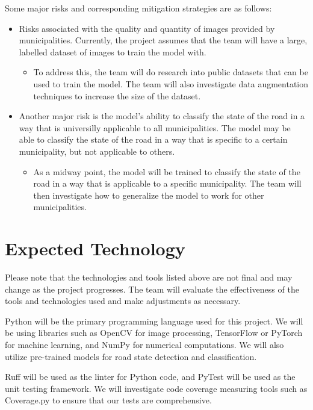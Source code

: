\documentclass{article}
\begin{document}
Some major risks and corresponding mitigation strategies are as follows:
\begin{itemize}
    \item Risks associated with the quality and quantity of images provided by municipalities. Currently, the project assumes that the team will have a large, labelled dataset of images to train the model with.
    \begin{itemize}
      \item To address this, the team will do research into public datasets that can be used to train the model. The team will also investigate data augmentation techniques to increase the size of the dataset.
    \end{itemize}  
    \item Another major risk is the model's ability to classify the state of the road in a way that is universilly applicable to all municipalities. The model may be able to classify the state of the road in a way that is specific to a certain municipality, but not applicable to others.
    \begin{itemize}
      \item As a midway point, the model will be trained to classify the state of the road in a way that is applicable to a specific municipality. The team will then investigate how to generalize the model to work for other municipalities.
    \end{itemize}
\end{itemize}

\section{Expected Technology}

Please note that the technologies and tools listed above are not final and may change as the project progresses. The team will evaluate the effectiveness of the tools and technologies used and make adjustments as necessary.

Python will be the primary programming language used for this project. We will be using libraries such as OpenCV for image processing, TensorFlow or PyTorch for machine learning, and NumPy for numerical computations. We will also utilize pre-trained models for road state detection and classification.

Ruff will be used as the linter for Python code, and PyTest will be used as the unit testing framework. We will investigate code coverage measuring tools such as Coverage.py to ensure that our tests are comprehensive.
\end{document}
